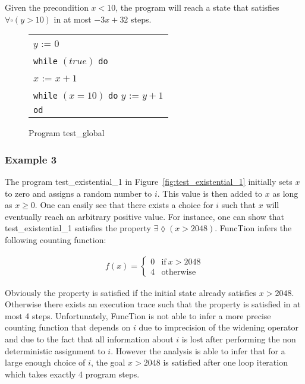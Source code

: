 \documentclass[11pt,a4paper,titlepage]{article}
\theoremstyle{definition}
\begin{document}
Given the precondition $x < 10$, the program will reach a state that satisfies $\forall\square(y > 10)$ in at most
$-3x + 32$ steps.

\begin{figure}
    \begin{center}
        \begin{tabular}{l}
            $y$ := $0$ \\
            \texttt{while} $(true)$ \texttt{do} \\
            \hspace{1em}$x$ := $x + 1$ \\
            \hspace{1em}\texttt{while} $(x = 10)$ \texttt{do} $y$ := $y + 1$ \\
            \texttt{od}
        \end{tabular}
    \end{center}
    \vspace{-1em}
    \caption{Program \textsf{test\_global}}
    \label{fig:test_global}
\end{figure}


\subsubsection*{Example 3}
The program \textsf{test\_existential\_1} in Figure~\ref{fig:test_existential_1} initially sets $x$ to zero and assigns a random number to $i$.
This value is then added to $x$ as long as $x \geq 0$. One can easily see that there exists 
a choice for $i$ such that $x$ will eventually reach an arbitrary positive value. 
For instance, one can show that \textsf{test\_existential\_1}
satisfies the property $\exists\lozenge(x > 2048)$. 
FuncTion infers the following counting function:

\begin{align*}
f(x) = \begin{cases}
    0  & \text{if} \ x > 2048 \\
    4  & \text{otherwise}
\end{cases}
\end{align*}

Obviously the property is satisfied if the initial state already satisfies $x > 2048$. Otherwise there exists an execution trace
such that the property is satisfied in at most 4 steps. Unfortunately, FuncTion is not able to infer a more precise 
counting function that depends on $i$ due to imprecision of the widening operator 
and due to the fact that all information about $i$ is lost after performing the non deterministic assignment to $i$. 
However the analysis is able to infer that for a large enough choice of $i$, the goal $x > 2048$ is satisfied after one loop iteration which takes exactly 
4 program steps.
\end{document}
